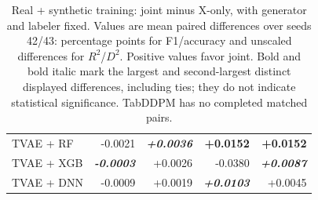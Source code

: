 \begin{table}[!t]
\begin{tabular}{@{}lrrrr@{}}
TVAE + RF & -0.0021 & \textbf{\textit{+0.0036}} & \textbf{+0.0152} & \textbf{+0.0152} \\
TVAE + XGB & \textbf{\textit{-0.0003}} & +0.0026 & -0.0380 & \textbf{\textit{+0.0087}} \\
TVAE + DNN & -0.0009 & +0.0019 & \textbf{\textit{+0.0103}} & +0.0045 \\
\bottomrule
\end{tabular}
\caption{Real + synthetic training: joint minus X-only, with generator and labeler fixed. Values are mean paired differences over seeds 42/43: percentage points for F1/accuracy and unscaled differences for $R^2$/$D^2$. Positive values favor joint. Bold and bold italic mark the largest and second-largest distinct displayed differences, including ties; they do not indicate statistical significance. TabDDPM has no completed matched pairs.}
\label{tab:joint-vs-xonly-mix}
\end{table}
